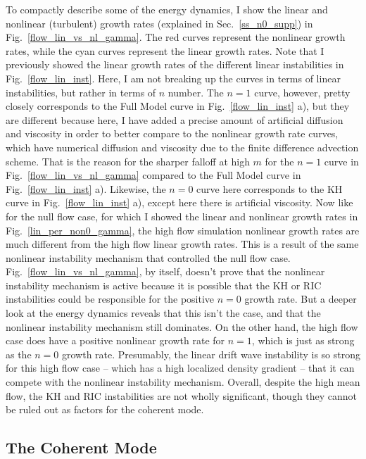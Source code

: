 To compactly describe some of the energy dynamics, I show the linear and nonlinear (turbulent) growth rates (explained in Sec.~\ref{ss_n0_supp}) in Fig.~\ref{flow_lin_vs_nl_gamma}. 
The red curves represent the nonlinear growth rates, while the cyan curves represent the linear growth rates. Note that I previously showed the linear growth rates of the different linear instabilities
in Fig.~\ref{flow_lin_inst}. Here, I am not breaking up the curves in terms of linear instabilities, but rather in terms of $n$ number. The $n=1$ curve, however, pretty closely
corresponds to the Full Model curve in Fig.~\ref{flow_lin_inst} a), but they are different because here, I have added a precise amount of artificial diffusion and viscosity in order to better compare to
the nonlinear growth rate curves, which have numerical diffusion and viscosity due to the finite difference advection scheme. That is the reason for the sharper falloff at high $m$ for the $n=1$
curve in Fig.~\ref{flow_lin_vs_nl_gamma} compared to the Full Model curve in Fig.~\ref{flow_lin_inst} a). Likewise, the $n=0$ curve here corresponds to the KH curve
in Fig.~\ref{flow_lin_inst} a), except here there is artificial viscosity.
Now like for the null flow case, for which I showed the linear and nonlinear growth rates in Fig.~\ref{lin_per_non0_gamma}, the high flow simulation nonlinear growth rates are 
much different from the high flow linear growth rates. This is a result of the same nonlinear instability mechanism that controlled the null flow case. Fig.~\ref{flow_lin_vs_nl_gamma}, by itself,
doesn't prove that the nonlinear instability mechanism is active because it is possible that the KH or RIC instabilities could be responsible for the positive $n=0$ growth rate. But a deeper look at
the energy dynamics reveals that this isn't the case, and that the nonlinear instability mechanism still dominates.
On the other hand, the high flow case does have a positive nonlinear growth rate for $n=1$, which is just as strong as the $n=0$ growth rate. Presumably, the linear drift wave instability is
so strong for this high flow case -- which has a high localized density gradient -- that it can compete with the nonlinear instability mechanism. Overall, despite the high mean flow,
the KH and RIC instabilities are not wholly significant, though they cannot be ruled out as factors for the coherent mode.

\subsection{The Coherent Mode}
\label{ss_coherent_mode}

